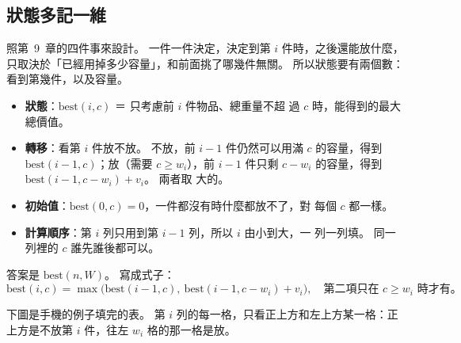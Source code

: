 \subsection{狀態多記一維}

照第~9~章的四件事來設計。 一件一件決定，決定到第 $i$ 件時，之後還能放什麼，
只取決於「已經用掉多少容量」，和前面挑了哪幾件無關。 所以狀態要有兩個數：
看到第幾件，以及容量。

\begin{itemize}
\item \textbf{狀態}：$\mathrm{best}(i, c)$ ＝ 只考慮前 $i$ 件物品、總重量不超
過 $c$ 時，能得到的最大總價值。
\item \textbf{轉移}：看第 $i$ 件放不放。 不放，前 $i - 1$ 件仍然可以用滿 $c$
的容量，得到 $\mathrm{best}(i - 1, c)$；放（需要 $c \ge w_i$），前 $i - 1$
件只剩 $c - w_i$ 的容量，得到 $\mathrm{best}(i - 1, c - w_i) + v_i$。 兩者取
大的。
\item \textbf{初始值}：$\mathrm{best}(0, c) = 0$，一件都沒有時什麼都放不了，對
每個 $c$ 都一樣。
\item \textbf{計算順序}：第 $i$ 列只用到第 $i - 1$ 列，所以 $i$ 由小到大，一
列一列填。 同一列裡的 $c$ 誰先誰後都可以。
\end{itemize}

答案是 $\mathrm{best}(n, W)$。 寫成式子：
\[
\mathrm{best}(i, c) = \max\bigl(\mathrm{best}(i - 1, c),\ \mathrm{best}(i - 1, c - w_i) + v_i\bigr),
\quad \text{第二項只在 } c \ge w_i \text{ 時才有。}
\]

下圖是手機的例子填完的表。 第 $i$ 列的每一格，只看正上方和左上方某一格：正
上方是不放第 $i$ 件，往左 $w_i$ 格的那一格是放。

